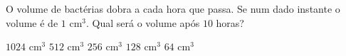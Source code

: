 O volume de bactérias dobra a cada hora que passa. Se num dado instante o volume é de $1$ cm$^3$. Qual será o volume após $10$ horas?

$1024$ cm$^3$
$512$ cm$^3$
$256$ cm$^3$
$128$ cm$^3$
$64$ cm$^3$


